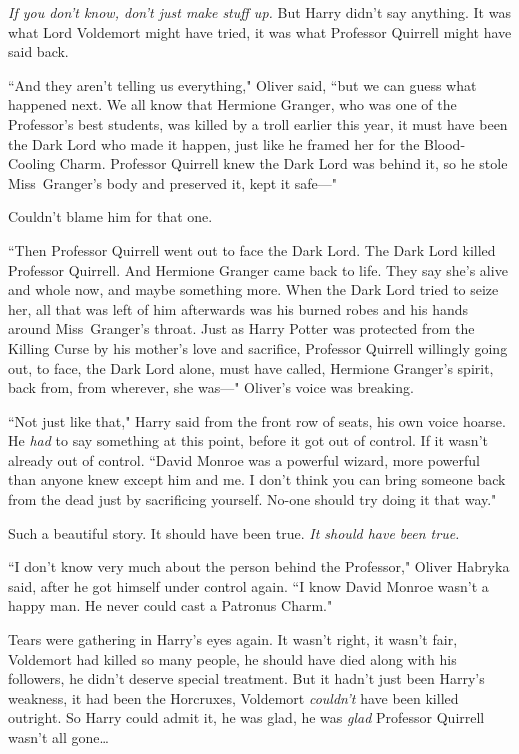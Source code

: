 \emph{If you don't know, don't just make stuff up.} But Harry didn't say anything. It was what Lord Voldemort might have tried, it was what Professor Quirrell might have said back.

``And they aren't telling us everything," Oliver said, ``but we can guess what happened next. We all know that Hermione Granger, who was one of the Professor's best students, was killed by a troll earlier this year, it must have been the Dark Lord who made it happen, just like he framed her for the Blood-Cooling Charm. Professor Quirrell knew the Dark Lord was behind it, so he stole Miss~Granger's body and preserved it, kept it safe—"

Couldn't blame him for that one.

``Then Professor Quirrell went out to face the Dark Lord. The Dark Lord killed Professor Quirrell. And Hermione Granger came back to life. They say she's alive and whole now, and maybe something more. When the Dark Lord tried to seize her, all that was left of him afterwards was his burned robes and his hands around Miss~Granger's throat. Just as Harry Potter was protected from the Killing Curse by his mother's love and sacrifice, Professor Quirrell willingly going out, to face, the Dark Lord alone, must have called, Hermione Granger's spirit, back from, from wherever, she was—" Oliver's voice was breaking.

``Not just like that," Harry said from the front row of seats, his own voice hoarse. He \emph{had} to say something at this point, before it got out of control. If it wasn't already out of control. ``David Monroe was a powerful wizard, more powerful than anyone knew except him and me. I don't think you can bring someone back from the dead just by sacrificing yourself. No-one should try doing it that way."

Such a beautiful story. It should have been true. \emph{It should have been true.}

``I don't know very much about the person behind the Professor," Oliver Habryka said, after he got himself under control again. ``I know David Monroe wasn't a happy man. He never could cast a Patronus Charm."

Tears were gathering in Harry's eyes again. It wasn't right, it wasn't fair, Voldemort had killed so many people, he should have died along with his followers, he didn't deserve special treatment. But it hadn't just been Harry's weakness, it had been the Horcruxes, Voldemort \emph{couldn't} have been killed outright. So Harry could admit it, he was glad, he was \emph{glad} Professor Quirrell wasn't all gone{\ldots}

